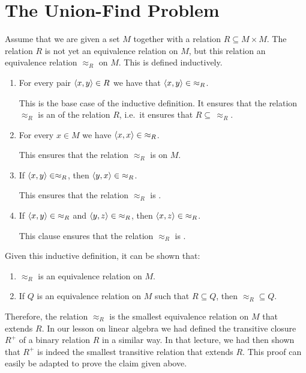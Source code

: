 \section{The Union-Find Problem}
Assume that we are given a set $M$ together with a relation $R \subseteq M \times M$.  The relation
$R$ is not yet an  equivalence relation on $M$, but this relation  an equivalence relation
$\approx_R$ on $M$.  This  is defined inductively.
\begin{enumerate}
\item For every pair $\pair(x,y) \in R$ we have that $\pair(x, y) \in\; \approx_R$.

      This is the base case of the inductive definition.  It ensures that the relation
      $\approx_R$ is an  of the relation $R$, i.e.~it ensures that $R \subseteq\, \approx_R$.
\item For every $x \in M$ we have $\pair(x,x) \in\; \approx_R$.

      This ensures that the relation $\approx_R$ is  on $M$.
\item If $\pair(x,y) \in \approx_R$, then $\pair(y,x) \in\; \approx_R$.

      This  ensures that the relation $\approx_R$ is .
\item If $\pair(x,y) \in\; \approx_R$ and $\pair(y,z) \in\; \approx_R$, then $\pair(x,z) \in\; \approx_R$.

      This clause ensures that the relation $\approx_R$ is .
\end{enumerate}
Given this inductive definition, it can be shown that:
\begin{enumerate}
\item $\approx_R$ is an equivalence relation on $M$.
\item If $Q$ is an equivalence relation on $M$ such that $R \subseteq Q$, then $\approx_R \subseteq Q$.
\end{enumerate}
Therefore, the relation $\approx_R$ is the smallest
equivalence relation on $M$ that extends $R$.  In our lesson on linear
algebra we had defined the transitive closure $R^+$ of a binary relation $R$ in a similar way.  In
that lecture, we had then shown that $R^+$ is indeed the smallest transitive relation that extends
$R$.  This proof can easily be adapted to prove the claim given above.

